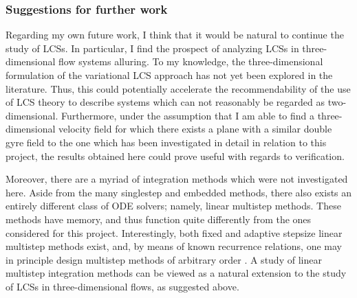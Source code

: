 \subsubsection{Suggestions for further work}

Regarding my own future work, I think that it would be natural to continue
the study of LCSs. In particular, I find the prospect of analyzing LCSs in
three-dimensional flow systems alluring. To my knowledge, the three-dimensional
formulation of the variational LCS approach has not yet been explored in the
literature. Thus, this could potentially accelerate the recommendability of
the use of LCS theory to describe systems which can not reasonably be regarded
as two-dimensional. Furthermore, under the assumption that I am able to
find a three-dimensional velocity field for which there exists a plane with a
similar double gyre field to the one which has been investigated in detail in
relation to this project, the results obtained here could prove useful
with regards to verification.

Moreover, there are a myriad of integration methods which were not investigated
here. Aside from the many singlestep and embedded methods, there also exists
an entirely different class of ODE solvers; namely, linear multistep methods.
These methods have memory, and thus function quite differently from the
ones considered for this project. Interestingly, both fixed and adaptive
stepsize linear multistep methods exist, and, by means of known recurrence
relations, one may in principle design multistep methods of arbitrary order
\parencite[chapter III]{hairer1993solving}. A study of linear multistep
integration methods can be viewed as a natural extension to the study of LCSs
in three-dimensional flows, as suggested above.





